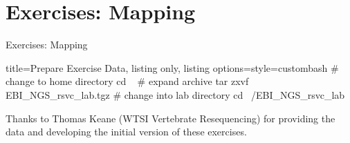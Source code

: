 \documentclass{beamer}
\begin{document}


\section{Exercises: Mapping}

\begin{frame}[fragile]{Exercises: Mapping}
\begin{tcblisting}{title={Prepare Exercise Data}, listing only, listing options={style=custombash}}
# change to home directory
cd ~
# expand archive
tar zxvf EBI_NGS_rsvc_lab.tgz
# change into lab directory
cd ~/EBI_NGS_rsvc_lab
\end{tcblisting}
\footnotesize{Thanks to Thomas Keane (WTSI Vertebrate Resequencing) for providing the data and developing the initial version of these exercises. }
\end{frame}
\end{document}
